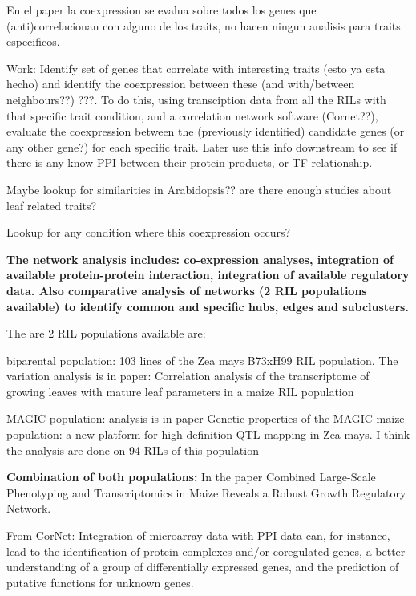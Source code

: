 \documentclass[a4paper,10pt]{article}
\begin{document}
\begin{description}
 En el paper la coexpression se evalua sobre todos los genes que (anti)correlacionan con alguno de los traits, no hacen ningun analisis para traits especificos.

 Work: Identify set of genes that correlate with interesting traits (esto ya esta hecho) and identify the coexpression between these (and with/between neighbours??) ???.
 To do this, using transciption data from all the RILs with that specific trait condition, and a correlation network software (Cornet??), evaluate the coexpression between the (previously identified) candidate genes (or any other gene?) for each specific trait.
 Later use this info downstream to see if there is any know PPI between their protein products, or TF relationship. 
 
 Maybe lookup for similarities in Arabidopsis?? are there enough studies about leaf related traits?
 
 Lookup for any condition where this coexpression occurs?
 
  \item [1.b. Integrative network analysis:  ] \textbf{The network analysis includes: co-expression analyses, integration of available protein-protein interaction, integration of available regulatory data. 
  Also comparative analysis of networks (2 RIL populations available) to identify common and specific hubs, edges and subclusters.}
 
The are 2 RIL populations available are: 
\begin{description}
 \item biparental population: 103 lines of the Zea mays B73xH99 RIL population.  The variation analysis is in paper: Correlation analysis of the transcriptome of growing leaves with mature leaf parameters in a maize RIL population 
 \item MAGIC population: analysis is in paper Genetic properties of the MAGIC maize population: a new platform for high definition QTL mapping in Zea mays. I think the analysis are done on 94 RILs of this population
 \end{description}
 
 \textbf{Combination of both populations:} In the paper Combined Large-Scale Phenotyping and Transcriptomics in Maize Reveals a Robust Growth Regulatory Network.
 
 
 
 From CorNet: Integration of microarray data with PPI data can, for instance, lead to the identification of protein complexes and/or coregulated genes, a better understanding of a group of differentially expressed genes, and the prediction of putative functions for unknown genes.


\end{description}
\end{document}
